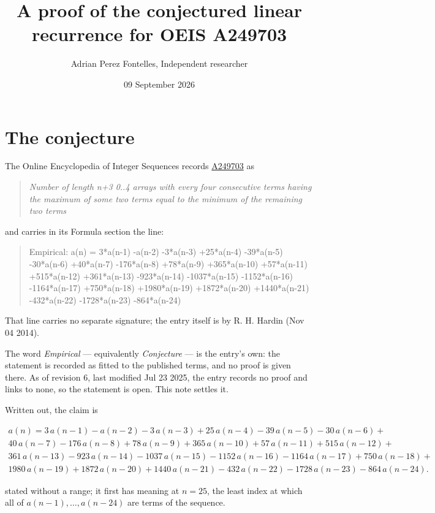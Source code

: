 \documentclass[11pt]{article}
\title{A proof of the conjectured linear recurrence for OEIS A249703}
\author{Adrian Perez Fontelles, Independent researcher}
\date{09 September 2026}
\theoremstyle{definition}
\begin{document}
\maketitle
\section{The conjecture}

The Online Encyclopedia of Integer Sequences records \href{https://oeis.org/A249703}{A249703} as

\begin{quote}\itshape Number of length n+3 0..4 arrays with every four consecutive terms having the maximum of some two terms equal to the minimum of the remaining two terms\end{quote}

and carries in its Formula section the line:

\begin{quote}\ttfamily Empirical: a(n) = 3*a(n-1) -a(n-2) -3*a(n-3) +25*a(n-4) -39*a(n-5) -30*a(n-6) +40*a(n-7) -176*a(n-8) +78*a(n-9) +365*a(n-10) +57*a(n-11) +515*a(n-12) +361*a(n-13) -923*a(n-14) -1037*a(n-15) -1152*a(n-16) -1164*a(n-17) +750*a(n-18) +1980*a(n-19) +1872*a(n-20) +1440*a(n-21) -432*a(n-22) -1728*a(n-23) -864*a(n-24)\end{quote}

That line carries no separate signature; the entry itself is by R. H. Hardin (Nov 04 2014).

The word {\itshape Empirical} --- equivalently {\itshape Conjecture} --- is the entry's own: the statement is recorded as fitted to the published terms, and no proof is given there. As of revision 6, last modified Jul 23 2025, the entry records no proof and links to none, so the statement is open. This note settles it.

Written out, the claim is

\begin{multline*} a(n) = 3\,a(n-1) - a(n-2) - 3\,a(n-3) + 25\,a(n-4) - 39\,a(n-5) - 30\,a(n-6) + \\ 40\,a(n-7) - 176\,a(n-8) + 78\,a(n-9) + 365\,a(n-10) + 57\,a(n-11) + 515\,a(n-12) + \\ 361\,a(n-13) - 923\,a(n-14) - 1037\,a(n-15) - 1152\,a(n-16) - 1164\,a(n-17) + 750\,a(n-18) + \\ 1980\,a(n-19) + 1872\,a(n-20) + 1440\,a(n-21) - 432\,a(n-22) - 1728\,a(n-23) - 864\,a(n-24). \end{multline*}

stated without a range; it first has meaning at $n = 25$, the least index at which all of $a(n-1),\dots,a(n-24)$ are terms of the sequence.
\end{document}
